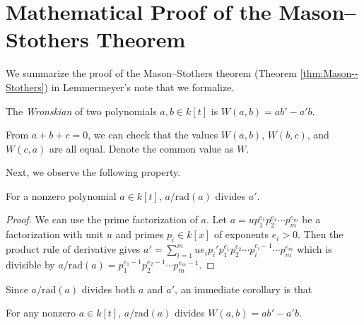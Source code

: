 \documentclass[runningheads]{llncs}
\newcommand{\rad}{\mathrm{rad}}
\begin{document}
\section{Mathematical Proof of the Mason--Stothers Theorem}
\label{sec:pf-mason-stothers}

We summarize the proof of the Mason--Stothers theorem (Theorem \ref{thm:Mason--Stothers}) in Lemmermeyer's note \cite{franz} that we formalize.
\begin{definition}
\label{def:wronskian}
The \emph{Wronskian} of two polynomials $a, b \in k[t]$ is $W(a, b) = ab' - a'b$.
\end{definition}
From $a + b + c = 0$, we can check that the values $W(a, b)$, $W(b, c)$, and $W(c, a)$ are all equal. Denote the common value as $W$.

Next, we observe the following property.
\begin{lemma}
\label{lem:main}
For a nonzero polynomial $a \in k[t]$, $a /\rad(a)$ divides $a'$.
\end{lemma}
\begin{proof}
We can use the prime factorization of $a$.
Let $a = u p_1 ^{e_1}  p_2 ^{e_2}  \cdots  p_m ^{e_m}$ be a factorization with unit $u$ and primes $p_i \in k[x]$ of exponents $e_i > 0$.
Then the product rule of derivative gives $a' = \sum_{i=1}^m u e_i p_i'  p_1 ^{e_1}  p_2 ^{e_2} \cdots p_i ^{e_i - 1} \cdots  p_m ^{e_m}$
which is divisible by $a /\rad(a) = p_1 ^{e_1 - 1}  p_2 ^{e_2 - 1} \cdots p_m ^{e_m - 1}$.
\end{proof}
Since $a / \rad(a)$ divides both $a$ and $a'$, an immediate corollary is that
\begin{lemma}
For any nonzero $a \in k[t]$, $a /\rad(a)$ divides $W(a, b) = ab' - a'b$.
\end{lemma}
\end{document}
